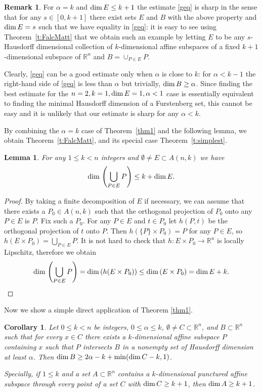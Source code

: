 \documentclass[a4paper]{amsart}
\newtheorem{lemma}[theorem]{Lemma}
\newtheorem{cor}[theorem]{Corollary}
\theoremstyle{definition} \newtheorem{remark}[theorem]{Remark}
\def\rr{{\mathbb R}}
\def\R{{\mathbb R}}
\def\su{\subset}
\def\al{\alpha}
\def\dim{{\rm dim}\, }
\begin{document}
\begin{remark}
\label{rem}
For $\al=k$ and $\dim E\le k+1$ the estimate \eqref{geq} is sharp in the sense that for any $s\in[0,k+1]$ there exist sets $E$ and $B$ with the above property and $\dim E=s$
such that we have equality in \eqref{geq}: 
it is easy to see using
Theorem~\ref{t:FalcMatt} that we obtain such an example by letting $E$ to be
any $s$-Hausdorff dimensional
collection of $k$-dimensional affine subspaces of a fixed
$k+1$-dimensional subspace of $\R^n$ and $B=\cup_{P\in E} P$.

Clearly, \eqref{geq} can be a good estimate only when $\al$ is close to $k$:
for $\al<k-1$ the right-hand side of \eqref{geq} is less than $\al$ 
but trivially, $\dim B\ge \al$.
Since finding the best estimate for the $n=2, k=1, \dim E=1, \al<1$ case is 
essentially equivalent to finding the minimal Hausdorff dimension of 
a Furstenberg set, this cannot be easy and it is unlikely that
our estimate is sharp for any $\al<k$.
\end{remark}

By combining the $\al=k$ case of Theorem~\ref{thm1} and the following lemma,
we obtain Theorem~\ref{t:FalcMatt}, and its special case 
Theorem~\ref{t:simplest}.

\begin{lemma}\label{l:easy}
\label{leq}
For any $1 \leq  k < n$ integers and 
$\emptyset\neq E\su A(n,k)$ we have
$$
\dim \left(\bigcup_{P \in E} P \right)\leq k + \dim E.
$$
\end{lemma}

\begin{proof}
By taking a finite decomposition of $E$ if necessary,
we can assume that there exists a $P_0\in A(n,k)$
such that the orthogonal projection of $P_0$ onto any
$P\in E$ is $P$. Fix such a $P_0$. 
For any $P\in E$ and $t\in P_0$ let $h(P,t)$ be the 
orthogonal projection of $t$ onto $P$. 
Then $h(\{P\}\times P_0)=P$ for any $P\in E$, so
$h(E\times P_0)=\bigcup_{P \in E} P$. 
It is not hard to check that $h:E\times P_0\to\R^n$
is locally Lipschitz, therefore we obtain
$$
\dim\left(\bigcup_{P \in E} P\right) =
\dim(h(E\times P_0)) \le
\dim(E\times P_0) = \dim E + k.
$$
\end{proof}

Now we show a simple direct application of Theorem \ref{thm1}. 

\begin{cor}
\label{fact1}
Let $0 \leq k < n$ be integers, $0 \leq \al \leq k$, $\emptyset \neq C \su \rr^n$, and $B \su \rr^n$ 
such that for every $x \in C$ there exists a $k$-dimensional affine subspace $P$ containing $x$ 
such that $P$ intersects $B$ in a nonempty set of Hausdorff dimension at least $\al$. 
Then $\dim B \geq 2\al-k + \min(\dim C - k, 1)$.

Specially, if $1 \leq k$ and a set $A \su \rr^n$ contains a $k$-dimensional punctured affine subspace through every point of a set $C$ with $\dim C \geq k+1$, then
$\dim A \geq k+1$. 
\end{cor}
\end{document}
